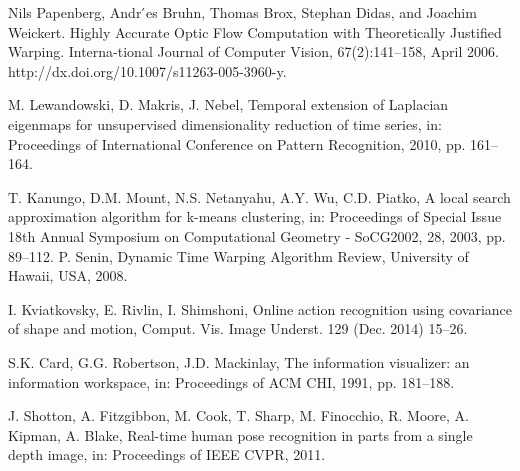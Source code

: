 \documentclass[runningheads,a4paper]{llncs}
\begin{document}
\begin{thebibliography}{4}
 Nils Papenberg, Andr ́es Bruhn, Thomas Brox, Stephan Didas, and Joachim Weickert. Highly Accurate Optic Flow Computation with Theoretically Justified Warping. Interna-tional Journal of Computer Vision, 67(2):141–158, April 2006. http://dx.doi.org/10.1007/s11263-005-3960-y.

 M. Lewandowski, D. Makris, J. Nebel, Temporal extension of Laplacian eigenmaps for unsupervised dimensionality reduction of time series, in: Proceedings of International Conference on Pattern Recognition, 2010, pp. 161–164. 

 T. Kanungo, D.M. Mount, N.S. Netanyahu, A.Y. Wu, C.D. Piatko, A local search approximation algorithm for k-means clustering, in: Proceedings of Special Issue 18th Annual Symposium on Computational Geometry - SoCG2002, 28, 2003, pp. 89–112. 
 P. Senin, Dynamic Time Warping Algorithm Review, University of Hawaii, USA, 2008. 

 I. Kviatkovsky, E. Rivlin, I. Shimshoni, Online action recognition using covariance of shape and motion, Comput. Vis. Image Underst. 129 (Dec. 2014) 15–26.

 S.K. Card, G.G. Robertson, J.D. Mackinlay, The information visualizer: an information workspace, in: Proceedings of ACM CHI, 1991, pp. 181–188. 

 J. Shotton, A. Fitzgibbon, M. Cook, T. Sharp, M. Finocchio, R. Moore, A. Kipman, A. Blake, Real-time human pose recognition in parts from a single depth image, in: Proceedings of IEEE CVPR, 2011.


\end{thebibliography}
\end{document}
